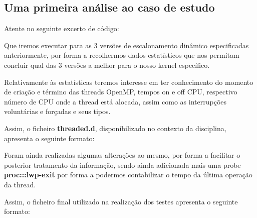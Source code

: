 \documentclass[a4paper]{article}
\begin{document}
 \subsection{Uma primeira análise ao caso de estudo}
\label{primeiraanalise}
Atente no seguinte excerto de código:

Que iremos executar para as 3 versões de escalonamento dinâmico especificadas anteriormente, por forma a recolhermos dados estatísticos que nos permitam concluir qual das 3 versões a melhor para o nosso kernel específico.\par
Relativamente às estatísticas teremos interesse em ter conhecimento do momento de criação e término das threads OpenMP, tempos on e off CPU, respectivo número de CPU onde a thread está alocada, assim como as interrupções voluntárias e forçadas e seus tipos.\par 
Assim, o ficheiro \textbf{threaded.d}, disponibilizado no contexto da disciplina, apresenta o seguinte formato:


Foram ainda realizadas algumas alterações ao mesmo, por forma a facilitar o posterior tratamento da informação, sendo ainda adicionada mais uma probe \textbf{proc:::lwp-exit} por forma a podermos contabilizar o tempo da última operação da thread.\par 
Assim, o ficheiro final utilizado na realização dos testes apresenta o seguinte formato:\par 
  
\end{document}
